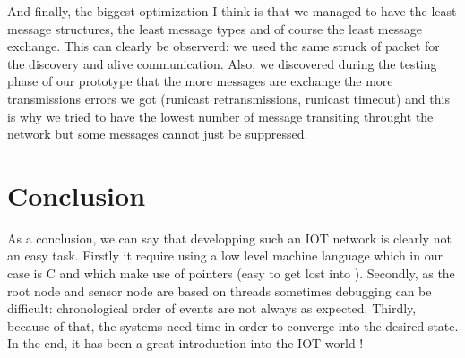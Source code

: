 \documentclass[a4paper,10pt]{article}
\begin{document}
And finally, the biggest optimization I think is that we managed to have the least message structures, the least message types and of course the least message exchange. This can clearly be observerd: we used the same struck of packet for the discovery and alive communication. Also, we discovered during the testing phase of our prototype that the more messages are exchange the more transmissions errors we got (runicast retransmissions, runicast timeout) and this is why we tried to have the lowest number of message transiting throught the network but some messages cannot just be suppressed.

\section{Conclusion}

As a conclusion, we can say that developping such an IOT network is clearly not an easy task. Firstly it require using a low level machine language which in our case is C and which make use of pointers (easy to get lost into ). Secondly, as the root node and sensor node are based on threads sometimes debugging can be difficult: chronological order of events are not always as expected. Thirdly, because of that, the systems need time in order to converge into the desired state. In the end, it has been a great introduction into the IOT world !
\end{document}

